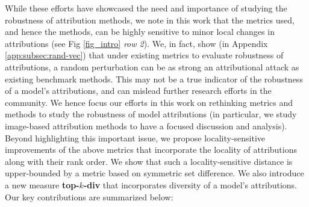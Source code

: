 \documentclass[letterpaper]{article} %
\begin{document}
While these efforts have showcased the need and importance of studying the robustness of attribution methods, we note in this work that the metrics used, and hence the methods, can be highly sensitive to minor local changes in attributions (see Fig \ref{fig_intro} \textit{row 2}).
We, in fact, show (in Appendix \ref{app:subsec:rand-vec}) that under existing metrics to evaluate robustness of attributions, a random perturbation can be as strong an attributional attack as existing benchmark methods. This may not be a true indicator of the robustness of a model's attributions, and can mislead further research efforts in the community. We hence focus our efforts in this work on rethinking metrics and methods to study the robustness of model attributions (in particular, we study image-based attribution methods to have a focused discussion and analysis). Beyond highlighting this important issue, we propose locality-sensitive improvements of the above metrics that incorporate the locality of attributions along with their rank order. We show that such a locality-sensitive distance is upper-bounded by a metric based on symmetric set difference. We also introduce a new measure {\bf top-$k$-div} that incorporates diversity of a model's attributions. %
Our key contributions are summarized below:
\end{document}
